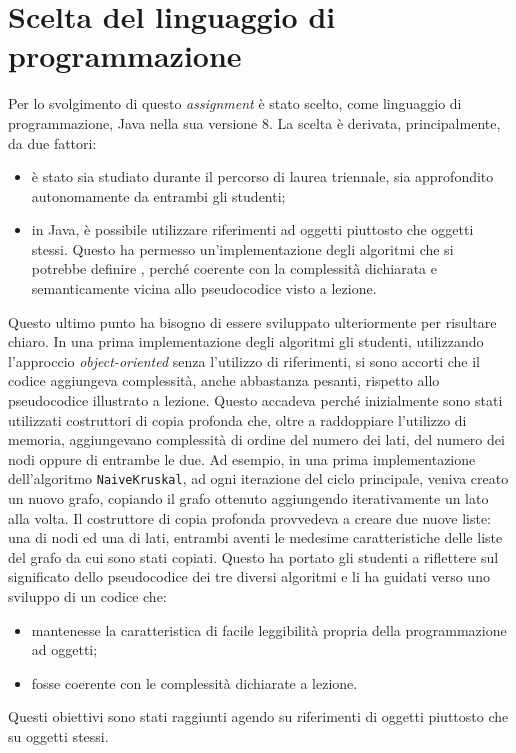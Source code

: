 \section{Scelta del linguaggio di programmazione}
Per lo svolgimento di questo \emph{assignment} è stato scelto, come linguaggio di programmazione, Java nella sua versione 8. La scelta è derivata, principalmente, da due fattori: 
\begin{itemize}
	\item è stato sia studiato durante il percorso di laurea triennale, sia approfondito autonomamente da entrambi gli studenti;
	\item in Java, è possibile utilizzare riferimenti ad oggetti piuttosto che oggetti stessi. Questo ha permesso un'implementazione degli algoritmi che si potrebbe definire , perché coerente con la complessità dichiarata e semanticamente vicina allo pseudocodice visto a lezione. 
\end{itemize}
Questo ultimo punto ha bisogno di essere sviluppato ulteriormente per risultare chiaro. In una prima implementazione degli algoritmi gli studenti, utilizzando l'approccio \textit{object-oriented} senza l'utilizzo di riferimenti, si sono accorti che il codice aggiungeva complessità, anche abbastanza pesanti, rispetto allo pseudocodice illustrato a lezione. Questo accadeva perché inizialmente sono stati utilizzati costruttori di copia profonda che, oltre a raddoppiare l'utilizzo di memoria, aggiungevano complessità di ordine del numero dei lati, del numero dei nodi oppure di entrambe le due. \eqcapo
Ad esempio, in una prima implementazione dell'algoritmo \texttt{NaiveKruskal}, ad ogni iterazione del ciclo principale, veniva creato un nuovo grafo, copiando il grafo ottenuto aggiungendo iterativamente un lato alla volta. Il costruttore di copia profonda provvedeva a creare due nuove liste: una di nodi ed una di lati, entrambi aventi le medesime caratteristiche delle liste del grafo da cui sono stati copiati.\eqcapo
 Questo ha portato gli studenti a riflettere sul significato dello pseudocodice dei tre diversi algoritmi e li ha guidati verso uno sviluppo di un codice che:
 \begin{itemize}
 	\item mantenesse la caratteristica di facile leggibilità propria della programmazione ad oggetti;
	\item fosse coerente con le complessità dichiarate a lezione.
 \end{itemize}
Questi obiettivi sono stati raggiunti agendo su riferimenti di oggetti piuttosto che su oggetti stessi.
\newpage
